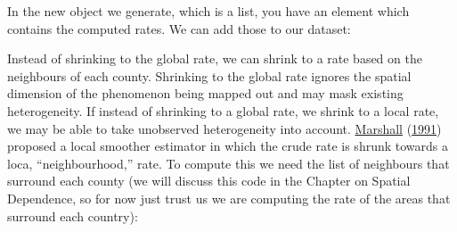 \documentclass[
  krantz2]{krantz}
\makeatletter
\newenvironment{Shaded}{\begin{snugshade}}{\end{snugshade}}
\newcommand{\AttributeTok}[1]{\textcolor[rgb]{0.61,0.61,0.61}{#1}}
\newcommand{\DecValTok}[1]{\textcolor[rgb]{0.06,0.06,0.06}{#1}}
\newcommand{\FunctionTok}[1]{\textcolor[rgb]{0,0,0}{#1}}
\newcommand{\NormalTok}[1]{#1}
\newcommand{\OtherTok}[1]{\textcolor[rgb]{0.37,0.37,0.37}{#1}}
\newcommand{\SpecialCharTok}[1]{\textcolor[rgb]{0,0,0}{#1}}
\newcommand{\StringTok}[1]{\textcolor[rgb]{0.5,0.5,0.5}{#1}}
\newenvironment{kframe}{%
\medskip{}
\setlength{\fboxsep}{.8em}
 \def\at@end@of@kframe{}%
 \ifinner\ifhmode%
  \def\at@end@of@kframe{\end{minipage}}%
  \begin{minipage}{\columnwidth}%
 \fi\fi%
 \def\FrameCommand##1{\hskip\@totalleftmargin \hskip-\fboxsep
 \colorbox{shadecolor}{##1}\hskip-\fboxsep
     \hskip-\linewidth \hskip-\@totalleftmargin \hskip\columnwidth}%
 \MakeFramed {\advance\hsize-\width
   \@totalleftmargin\z@ \linewidth\hsize
   \@setminipage}}%
 {\par\unskip\endMakeFramed%
 \at@end@of@kframe}
\renewenvironment{Shaded}{\begin{kframe}}{\end{kframe}}
\makeatother
\begin{document}
\begin{Shaded}
\end{Shaded}

In the new object we generate, which is a list, you have an element which contains the computed rates. We can add those to our dataset:

\begin{Shaded}
\end{Shaded}

Instead of shrinking to the global rate, we can shrink to a rate based on the neighbours of each county. Shrinking to the global rate ignores the spatial dimension of the phenomenon being mapped out and may mask existing heterogeneity. If instead of shrinking to a global rate, we shrink to a local rate, we may be able to take unobserved heterogeneity into account. \protect\hyperlink{ref-Marshall_1991}{Marshall} (\protect\hyperlink{ref-Marshall_1991}{1991}) proposed a local smoother estimator in which the crude rate is shrunk towards a loca, ``neighbourhood,'' rate. To compute this we need the list of neighbours that surround each county (we will discuss this code in the Chapter on Spatial Dependence, so for now just trust us we are computing the rate of the areas that surround each country):

\begin{Shaded}
\end{Shaded}
\end{document}
